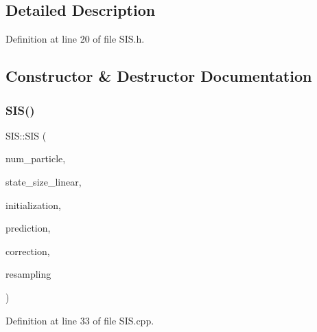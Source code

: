 \subsection{Detailed Description}


Definition at line 20 of file S\+I\+S.\+h.



\subsection{Constructor \& Destructor Documentation}
\mbox{\label{classbfl_1_1SIS_a44f7f06407314169a89d4b33d97978b1}} 
\subsubsection{\texorpdfstring{S\+I\+S()}{SIS()}\hspace{0.1cm}{\footnotesize\ttfamily [1/3]}}
{\footnotesize\ttfamily S\+I\+S\+::\+S\+IS (\begin{DoxyParamCaption}\item[{unsigned int}]{num\+\_\+particle,  }\item[{std\+::size\+\_\+t}]{state\+\_\+size\+\_\+linear,  }\item[{std\+::unique\+\_\+ptr$<$ \mbox{\hyperlink{classbfl_1_1ParticleSetInitialization}{Particle\+Set\+Initialization}} $>$}]{initialization,  }\item[{std\+::unique\+\_\+ptr$<$ \mbox{\hyperlink{classbfl_1_1PFPrediction}{P\+F\+Prediction}} $>$}]{prediction,  }\item[{std\+::unique\+\_\+ptr$<$ \mbox{\hyperlink{classbfl_1_1PFCorrection}{P\+F\+Correction}} $>$}]{correction,  }\item[{std\+::unique\+\_\+ptr$<$ \mbox{\hyperlink{classbfl_1_1Resampling}{Resampling}} $>$}]{resampling }\end{DoxyParamCaption})\hspace{0.3cm}{\ttfamily [noexcept]}}



Definition at line 33 of file S\+I\+S.\+cpp.

\mbox{\label{classbfl_1_1SIS_a630371dd09c45f979dbfee7da59d6ab2}} 
